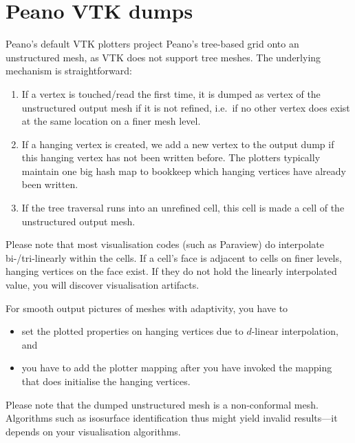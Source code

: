 \chapter{Peano VTK dumps}

Peano's default VTK plotters project Peano's tree-based grid onto an
unstructured mesh, as VTK does not support tree meshes.
The underlying mechanism is straightforward:

\begin{enumerate}
  \item If a vertex is touched/read the first time, it is dumped as vertex of
  the unstructured output mesh if it is not refined, i.e.~if no other vertex
  does exist at the same location on a finer mesh level.
  \item If a hanging vertex is created, we add a new vertex to the output dump
  if this hanging vertex has not been written before. The plotters typically
  maintain one big hash map to bookkeep which hanging vertices have already been
  written.
  \item If the tree traversal runs into an unrefined cell, this cell is made a
  cell of the unstructured output mesh.
\end{enumerate}


\noindent
Please note that most visualisation codes (such as Paraview) do interpolate
bi-/tri-linearly within the cells. 
If a cell's face is adjacent to cells on finer levels, hanging vertices on the
face exist.
If they do not hold the linearly interpolated value, you will discover
visualisation artifacts.

\begin{remark}
  For smooth output pictures of meshes with adaptivity, you have to 
  \begin{itemize}
    \item set the plotted properties on hanging vertices due to $d$-linear
    interpolation, and
    \item you have to add the plotter mapping after you have invoked the mapping
    that does initialise the hanging vertices.
  \end{itemize}
\end{remark}


\noindent
Please note that the dumped unstructured mesh is a non-conformal mesh. 
Algorithms such as isosurface identification thus might yield invalid
results---it depends on your visualisation algorithms.

